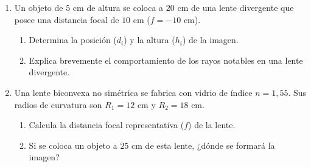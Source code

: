\documentclass[11pt, letterpaper]{article}
\newif\ifshowanswers
\newcommand{\answer}[1]{ 
	\ifshowanswers 
	\par\vspace{0.15cm} 
	\begin{tcolorbox}[colback=blue!5!white, colframe=blue!60!white, arc=1mm, boxrule=0.5pt, title=\textbf{\footnotesize SOLUCIÓN PASO A PASO (DOCENTE)}] 
		\color{blue!80!black}\footnotesize #1 
	\end{tcolorbox} 
	\par\vspace{0.15cm} 
	\else 
	\par\vspace{0.3cm} 
	\fi 
}
\begin{document}
\begin{enumerate}[leftmargin=*, itemsep=0.8cm]
		\item  Un objeto de $5\text{ cm}$ de altura se coloca a $20\text{ cm}$ de una lente divergente que posee una distancia focal de $10\text{ cm}$ ($f = -10\text{ cm}$). 
		\begin{enumerate}[label=\alph*), itemsep=0.2cm] 
			\item Determina la posición ($d_i$) y la altura ($h_i$) de la imagen. 
			\item Explica brevemente el comportamiento de los rayos notables en una lente divergente. 
		\end{enumerate} 
		\answer{ 
			a) $\frac{1}{-10} = \frac{1}{20} + \frac{1}{d_i} \implies \frac{1}{d_i} = -\frac{1}{10} - \frac{1}{20} = -\frac{3}{20} \implies d_i = \mathbf{-6,67\text{ cm}}$.\\ 
			Altura: $A = -\frac{-6,67}{20} = +\frac{1}{3} \implies h_i = \left(\frac{1}{3}\right) \cdot 5\text{ cm} = \mathbf{+1,67\text{ cm}}$.\\[0.1cm] 
			b) El rayo paralelo se refracta divergiendo de modo que su prolongación pasa por el foco del lado del objeto; el rayo central cruza el centro óptico sin desviarse. La imagen es \textbf{virtual, derecha y reducida}. 
		} 
		
		\item Una lente biconvexa no simétrica se fabrica con vidrio de índice $n = 1,55$. Sus radios de curvatura son $R_1 = 12\text{ cm}$ y $R_2 = 18\text{ cm}$. 
		\begin{enumerate}[label=\alph*), itemsep=0.2cm] 
			\item Calcula la distancia focal representativa ($f$) de la lente. 
			\item Si se coloca un objeto a $25\text{ cm}$ de esta lente, ¿dónde se formará la imagen? 
		\end{enumerate} 
		\answer{ 
			a) $\frac{1}{f} = (n - 1) \left(\frac{1}{R_1} + \frac{1}{R_2}\right) = (1,55 - 1) \left(\frac{1}{12} + \frac{1}{18}\right) = 0,55 \cdot \frac{5}{36} = \frac{2,75}{36} \implies f = \mathbf{13,09\text{ cm}}$.\\[0.1cm] 
			b) $\frac{1}{d_i} = \frac{1}{13,09} - \frac{1}{25} \approx 0,07639 - 0,04 = 0,03639 \implies d_i \approx \mathbf{27,48\text{ cm}}$ al otro lado de la lente. 
		} 
		

\end{enumerate}
\end{document}
